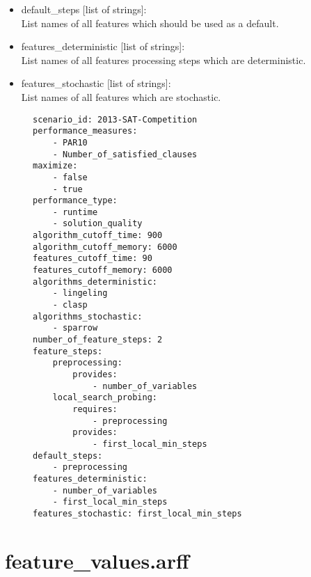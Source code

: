 \documentclass[]{elsarticle}
\begin{document}
\begin{itemize}
  	      		$\-\hspace{2cm}$ requires:\\
  	      		$\-\hspace{3cm}$ - name\_1\\
  	      		$\-\hspace{2cm}$ provides:\\
  	      		$\-\hspace{3cm}$ - feature3\\
              	You are free to use any step names you like, 
              	as long as they are unique and do not contain illegal characters.
    \item default\_steps [list of strings]:\\
    	  List names of all features which should be used as a default.
    \item features\_deterministic [list of strings]:\\
    	  List names of all features processing steps which are deterministic.
    \item features\_stochastic [list of strings]:\\
          List names of all features which are stochastic. 
\end{itemize}

\begin{figure}
\begin{lstlisting}[caption=Example description.txt]
scenario_id: 2013-SAT-Competition
performance_measures:
    - PAR10
    - Number_of_satisfied_clauses
maximize:
    - false
    - true
performance_type: 
    - runtime
    - solution_quality
algorithm_cutoff_time: 900
algorithm_cutoff_memory: 6000
features_cutoff_time: 90
features_cutoff_memory: 6000
algorithms_deterministic:
    - lingeling
    - clasp
algorithms_stochastic: 
    - sparrow
number_of_feature_steps: 2
feature_steps:
    preprocessing:
        provides: 
            - number_of_variables
    local_search_probing:
        requires:
            - preprocessing
        provides:
            - first_local_min_steps
default_steps: 
    - preprocessing
features_deterministic:
    - number_of_variables
    - first_local_min_steps
features_stochastic: first_local_min_steps
\end{lstlisting}
\end{figure}

\section{feature\_values.arff}
\end{document}
